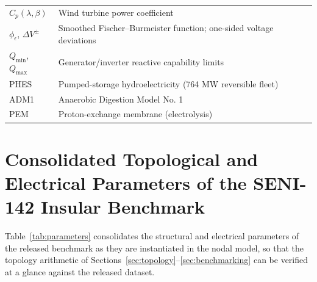\begin{table}[!t]
\begin{tabular}{@{}p{} p{}@{}}
$C_p(\lambda, \beta)$ & Wind turbine power coefficient \\
$\phi_\epsilon$, $\Delta V^{\pm}$ & Smoothed Fischer--Burmeister function; one-sided voltage deviations \\
$Q_{\min}$, $Q_{\max}$ & Generator/inverter reactive capability limits \\
PHES & Pumped-storage hydroelectricity (764 MW reversible fleet) \\
ADM1 & Anaerobic Digestion Model No. 1 \\
PEM & Proton-exchange membrane (electrolysis) \\
\bottomrule
\end{tabular}
\end{table}

\appendix
\section{Consolidated Topological and Electrical Parameters of the SENI-142 Insular Benchmark}
\label{app:parameters}

Table~\ref{tab:parameters} consolidates the structural and electrical parameters of the released benchmark as they are instantiated in the nodal model, so that the topology arithmetic of Sections~\ref{sec:topology}--\ref{sec:benchmarking} can be verified at a glance against the released dataset.

